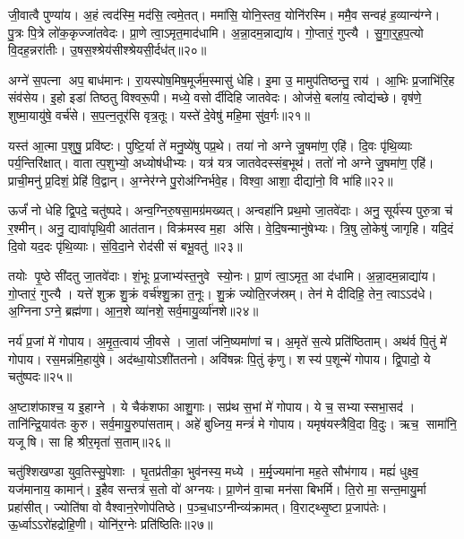 जी॒वात्वै पुण्या॑य। अ॒हं त्वद॑स्मि॒ मद॑सि॒ त्वमे॒तत्। ममा॑सि॒ योनि॒स्तव॒ योनि॑रस्मि। ममै॒व सन्वह॑ ह॒व्यान्य॑ग्ने। पु॒त्रः पि॒त्रे लो॑क॒कृज्जा॑तवेदः। प्रा॒णे त्वा॒ऽमृत॒माद॑धामि। अ॒न्ना॒दम॒न्नाद्या॑य। गो॒प्तारं॒ गुप्त्यै। सु॒गा॒र्॒ह॒प॒त्यो वि॒दह॒न्नरा॑तीः। उ॒षस॒श्श्रेय॑सीश्श्रेयसी॒र्दध॑त्॥२०॥

अग्ने॑ स॒पत्ना अप॒ बाध॑मानः। रा॒यस्पोष॒मिष॒मूर्ज॑म॒स्मासु॑ धेहि। इ॒मा उ॒ मामुप॑तिष्ठन्तु॒ राय॑। आ॒भिः प्र॒जाभि॑रि॒ह संव॑सेय। इ॒हो इडा॑ तिष्ठतु विश्वरू॒पी। मध्ये॒ वसोर्दीदिहि जातवेदः। ओज॑से॒ बला॑य॒ त्वोद्य॑च्छे। वृष॑णे॒ शुष्मा॒यायु॑षे॒ वर्च॑से। स॒प॒त्न॒तूर॑सि वृत्र॒तूः। यस्ते॑ दे॒वेषु॑ महि॒मा सु॑व॒र्गः॥२१॥

यस्त॑ आ॒त्मा प॒शुषु॒ प्रवि॑ष्टः। पुष्टि॒र्या ते॑ मनु॒ष्ये॑षु पप्र॒थे। तया॑ नो अग्ने जु॒षमा॑ण॒ एहि॑। दि॒वः पृ॑थि॒व्याः पर्य॒न्तिरि॑क्षात्। वातात्प॒शुभ्यो॒ अध्योष॑धीभ्यः। यत्र॑ यत्र जातवेदस्संब॒भूथ॑। ततो॑ नो अग्ने जु॒षमा॑ण॒ एहि॑। प्राची॒मनु॑ प्र॒दिशं॒ प्रेहि॑ वि॒द्वान्। अ॒ग्नेर॑ग्ने पु॒रोअ॑ग्निर्भवे॒ह। विश्वा॒ आशा॒ दीद्या॑नो॒ वि भा॑हि॥२२॥

ऊर्जं॑ नो धेहि द्वि॒पदे॒ चतु॑ष्पदे। अन्व॒ग्निरु॒षसा॒मग्र॑मख्यत्। अन्वहा॑नि प्रथ॒मो जा॒तवे॑दाः। अनु॒ सूर्य॑स्य पुरु॒त्रा च॑ र॒श्मीन्। अनु॒ द्यावा॑पृथि॒वी आत॑तान। विक्र॑मस्व म॒हा अ॑सि। वे॒दि॒षन्मानु॑षेभ्यः। त्रि॒षु लो॒केषु॑ जागृहि। यदि॒दं दि॒वो यद॒दः पृ॑थि॒व्याः। सं॒वि॒दा॒ने रोद॑सी सं बभू॒वतु॑॥२३॥

तयोः पृ॒ष्ठे सी॑दतु जा॒तवे॑दाः। शं॒भूः प्र॒जाभ्य॑स्त॒नुवे स्यो॒नः। प्रा॒णं त्वा॒ऽमृत॒ आ द॑धामि। अ॒न्ना॒दम॒न्नाद्या॑य। गो॒प्तारं॒ गुप्त्यै। यत्ते॑ शुक्र शु॒क्रं वर्च॑श्शु॒क्रा त॒नूः। शु॒क्रं ज्योति॒रज॑स्रम्। तेन॑ मे दीदिहि॒ तेन॒ त्वाऽऽद॑धे। अ॒ग्निनाऽग्ने॒ ब्रह्म॑णा। आ॒न॒शे व्या॑नशे॒ सर्व॒मायु॒र्व्या॑नशे॥२४॥

नर्य॑ प्र॒जां मे॑ गोपाय। अ॒मृ॒त॒त्वाय॑ जी॒वसे। जा॒तां ज॑नि॒ष्यमा॑णां च। अ॒मृते॑ स॒त्ये प्रति॑ष्ठिताम्। अथ॑र्व पि॒तुं मे॑ गोपाय। रस॒मन्न॑मि॒हायु॑षे। अद॑ब्धा॒योऽशी॑ततनो। अवि॑षन्नः पि॒तुं कृ॑णु। शस्य॑ प॒शून्मे॑ गोपाय। द्वि॒पादो॒ ये चतु॑ष्पदः॥२५॥

अ॒ष्टाश॑फाश्च॒ य इ॒हाग्ने। ये चैक॑शफा आशु॒गाः। सप्र॑थ स॒भां मे॑ गोपाय। ये च॒ सभ्यास्सभा॒सद॑। तानि॑न्द्रि॒याव॑तः कुरु। सर्व॒मायु॒रुपा॑सताम्। अहे॑ बुध्निय॒ मन्त्रं॑ मे गोपाय। यमृष॑यस्त्रैवि॒दा वि॒दुः। ऋच॒ सामा॑नि॒ यजूषि। सा हि श्रीर॒मृता॑ स॒ताम्॥२६॥

चतु॑श्शिखण्डा युव॒तिस्सु॒पेशाः। घृ॒तप्र॑तीका॒ भुव॑नस्य॒ मध्ये। म॒र्मृ॒ज्यमा॑ना मह॒ते सौभ॑गाय। मह्यं॑ धुक्ष्व॒ यज॑मानाय॒ कामान्॑। इ॒हैव सन्तत्र॑ स॒तो वो॑ अग्नयः। प्रा॒णेन॑ वा॒चा मन॑सा बिभर्मि। ति॒रो मा॒ सन्त॒मायु॒र्मा प्रहा॑सीत्। ज्योति॑षा वो वैश्वान॒रेणोप॑तिष्ठे। प॒ञ्च॒धाऽग्नीन्व्य॑क्रामत्। वि॒राट्थ्सृ॒ष्टा प्र॒जाप॑तेः। ऊ॒र्ध्वाऽऽरो॑हद्रोहि॒णी। योनि॑र॒ग्नेः प्रति॑ष्ठितिः॥२७॥\anuvakamend[वि॒श॒न्तु॒ न॒ पु॒रू॒चीर्वि॑धेम नि॒धाय॒ यत्तेऽप्र॑दाहाय बृह॒त्यो ब्रह्म॑णा दुवस्यत वि॒श्ववा॑र इ॒ममृ॑ञ्जते पुरो॒गां प्रज॑नयि॒ष्यथो॑ जनि॒ष्यतेऽस्मै॒ मम॑ महि॒म्ना वर्च॑से॒ दध॑थ्सुव॒र्गो भा॑हि संबभू॒वतु॒रायु॒र्व्या॑नशे॒ चतु॑ष्सदस्स॒तां प्र॒जाप॑ते॒र्द्वे च॑]

